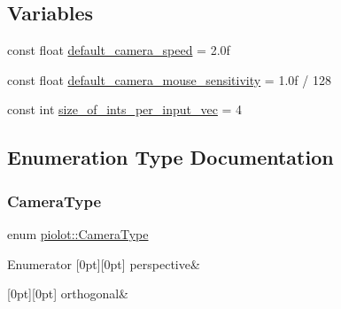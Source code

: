 \subsection*{Variables}
\begin{DoxyCompactItemize}
\item 
const float \mbox{\hyperlink{namespacepiolot_ad09978d4f33e2559089adbc964c31992}{default\+\_\+camera\+\_\+speed}} = 2.\+0f
\item 
const float \mbox{\hyperlink{namespacepiolot_a748a31cf105e50f2a20ccaba5fd374d3}{default\+\_\+camera\+\_\+mouse\+\_\+sensitivity}} = 1.\+0f / 128
\item 
const int \mbox{\hyperlink{namespacepiolot_a2177dc31bf4c745a1fb11e217fdf6f01}{size\+\_\+of\+\_\+ints\+\_\+per\+\_\+input\+\_\+vec}} = 4
\end{DoxyCompactItemize}


\subsection{Enumeration Type Documentation}
\mbox{\label{namespacepiolot_a8ffac0a73d973fb66879963da5defc90}} 
\subsubsection{\texorpdfstring{Camera\+Type}{CameraType}}
{\footnotesize\ttfamily enum \mbox{\hyperlink{namespacepiolot_a8ffac0a73d973fb66879963da5defc90}{piolot\+::\+Camera\+Type}}}

\begin{DoxyEnumFields}{Enumerator}
[0pt][0pt]{}\mbox{\label{namespacepiolot_a8ffac0a73d973fb66879963da5defc90a2306e17263193ee4e70fe9756faef528}} 
perspective&\\
\hline

[0pt][0pt]{}\mbox{\label{namespacepiolot_a8ffac0a73d973fb66879963da5defc90a13a3f6c076aead69259dbda7be1d234f}} 
orthogonal&\\
\hline

\end{DoxyEnumFields}
\mbox{\label{namespacepiolot_a23b501c43e72ecf3dbf1146b2919c3a3}} 
